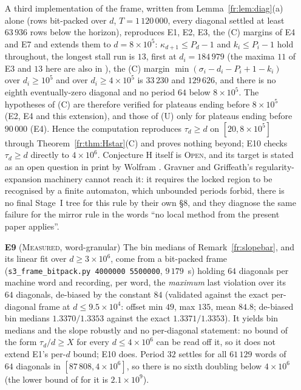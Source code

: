 \documentclass[11pt]{article}
\theoremstyle{definition}
\theoremstyle{remark}
\newcommand{\MEASURED}{\textsc{Measured}}
\newcommand{\OPEN}{\textsc{Open}}
\begin{document}
\begin{enumerate}
A third implementation of the frame, written from Lemma~\ref{fr:lem:diag}(a) alone (rows bit-packed over
$d$, $T=1\,120\,000$, every diagonal settled at least $63\,936$ rows below the horizon), reproduces E1, E2, E3, the (C) margins of E4 and E7 and extends them to
$d=8\times10^{5}$: $\kappa_{d+1}\le P_d-1$ and $k_i\le P_i-1$ hold throughout, the longest stall run is $13$,
first at $d_i=184\,979$ (the maxima $11$ of E3 and $13$ here are also in \cite{Dib}), the (C) margin $\min(\sigma_i-d_i-P_i+1-k_i)$ over $d_i\ge10^{5}$ and over
$d_i\ge4\times10^{5}$ is $33\,230$ and $129\,626$, and there is no eighth eventually-zero diagonal and no
period $64$ below $8\times10^{5}$. The hypotheses of (C) are therefore verified for plateaus ending before
$8\times10^{5}$ (E2, E4 and this extension), and those of (U) only for plateaus ending before $90\,000$
(E4). Hence the computation reproduces $\tau_d\ge d$ on $[20,8\times10^{5}]$ through Theorem~\ref{fr:thm:Hstar}(C) and proves nothing beyond; E10 checks $\tau_d\ge d$ directly to $4\times10^{6}$. Conjecture H itself is \OPEN, and its target is stated as an open question in print by Wolfram \cite{Wolfram}. Gravner and Griffeath's regularity-expansion machinery cannot reach it: it requires the locked region to be recognised by a finite automaton, which unbounded periods forbid, there is no final Stage~I tree for this rule by their own \S8, and they diagnose the same failure for the mirror rule in the words ``no local method from the present paper applies''.
\item[\textbf{E9}] (\MEASURED, word-granular) The bin medians of Remark~\ref{fr:slopebar}, and its linear fit over $d\ge3\times10^{6}$, come from a bit-packed frame (\texttt{s3\_frame\_bitpack.py 4000000 5500000}, $9\,179$~s) holding $64$ diagonals per machine word and recording, per word, the \emph{maximum} last violation over its $64$ diagonals, de-biased by the constant $84$ (validated against the exact per-diagonal frame at $d\le9.5\times10^{4}$: offset min $49$, max $135$, mean $84.8$; de-biased bin medians $1.3370/1.3353$ against the exact $1.3371/1.3353$). It yields bin medians and the slope robustly and no per-diagonal statement: no bound of the form $\tau_d/d\ge X$ for every $d\le4\times10^{6}$ can be read off it, so it does not extend E1's per-$d$ bound; E10 does. Period $32$ settles for all $61\,129$ words of $64$ diagonals in $[87\,808,4\times10^{6}]$, so there is no sixth doubling below $4\times10^{6}$ (the lower bound of \cite{NKS} for it is $2.1\times10^{9}$).

\end{enumerate}
\end{document}
